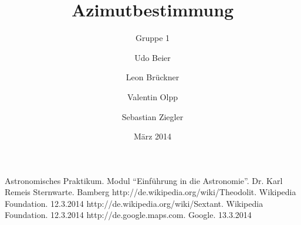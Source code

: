 
%
%


\title{Azimutbestimmung}
\subtitle{Gruppe 1}
\date{März 2014}
\author{Udo Beier \and Leon Brückner \and Valentin Olpp \and Sebastian Ziegler}

\maketitle
\tableofcontents
\newpage
\listoffigures
\listoftables
\newpage

\newpage






%
\newpage
%
%

\begin{thebibliography}{9}
 Astronomisches Praktikum. Modul \enquote{Einführung in die Astronomie}. Dr. Karl Remeis Sternwarte. Bamberg
 http://de.wikipedia.org/wiki/Theodolit. Wikipedia Foundation. 12.3.2014
 http://de.wikipedia.org/wiki/Sextant. Wikipedia Foundation. 12.3.2014
 http://de.google.maps.com. Google. 13.3.2014
\end{thebibliography}
